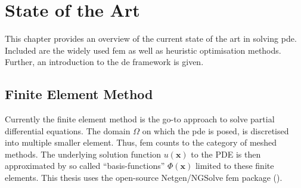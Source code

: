 \documentclass[./\jobname.tex]{subfiles}
\begin{document}
\section{State of the Art}
\label{chap:state_of_the_art}
This chapter provides an overview of the current state of the art in solving \gls{pde}. Included are the widely used \gls{fem} as well as heuristic optimisation methods. Further, an introduction to the \gls{de} framework is given.

\subsection{Finite Element Method}
Currently the finite element method is the go-to approach to solve partial differential equations. The domain $\Omega$ on which the \gls{pde} is posed, is discretised into multiple smaller element. Thus, \gls{fem} counts to the category of meshed methods. The underlying solution function $u(\mathbf{x})$ to the PDE is then approximated by so called ``basis-functions'' $\Phi(\mathbf{x})$ limited to these finite elements. This thesis uses the open-source Netgen/NGSolve \gls{fem} package (\cite{schoberl_ngsolvengsolve_2020}). 
\end{document}
